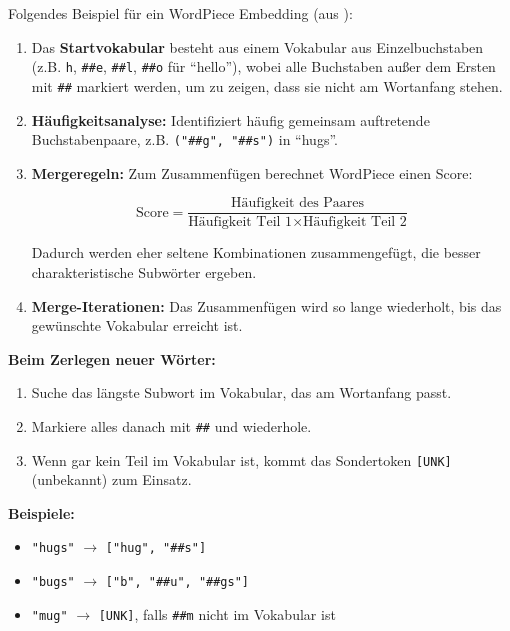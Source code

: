 Folgendes Beispiel für ein WordPiece Embedding (aus \cite{huggingface2025wordpiece}):
\begin{enumerate}
    \item Das \textbf{Startvokabular} besteht aus einem Vokabular aus Einzelbuchstaben 
    (z.B. \texttt{h}, \texttt{\#\#e}, \texttt{\#\#l}, \texttt{\#\#o} für ``hello''), 
    wobei alle Buchstaben außer dem Ersten mit \texttt{\#\#} markiert werden, um zu zeigen, dass sie nicht am Wortanfang stehen.

    \item \textbf{Häufigkeitsanalyse:} Identifiziert häufig gemeinsam auftretende Buchstabenpaare, 
    z.B. \texttt{("\#\#g", "\#\#s")} in ``hugs''.

    \item \textbf{Mergeregeln:} Zum Zusammenfügen berechnet WordPiece einen Score:

    \begin{equation}
        \text{Score} = \frac{\text{Häufigkeit des Paares}}{\text{Häufigkeit Teil 1} \times \text{Häufigkeit Teil 2}}
    \end{equation}

    Dadurch werden eher seltene Kombinationen zusammengefügt, die besser charakteristische Subwörter ergeben.

    \item \textbf{Merge-Iterationen:} Das Zusammenfügen wird so lange wiederholt, bis das gewünschte Vokabular erreicht ist.
\end{enumerate}

\textbf{Beim Zerlegen neuer Wörter:}
\begin{enumerate}
    \item Suche das längste Subwort im Vokabular, das am Wortanfang passt.
    \item Markiere alles danach mit \texttt{\#\#} und wiederhole.
    \item Wenn gar kein Teil im Vokabular ist, kommt das Sondertoken \texttt{[UNK]} (unbekannt) zum Einsatz.
\end{enumerate}

\textbf{Beispiele:}
\begin{itemize}
    \item \texttt{"hugs"} $\rightarrow$ \texttt{["hug", "\#\#s"]}
    \item \texttt{"bugs"} $\rightarrow$ \texttt{["b", "\#\#u", "\#\#gs"]}
    \item \texttt{"mug"} $\rightarrow$ \texttt{[UNK]}, falls \texttt{\#\#m} nicht im Vokabular ist
\end{itemize}

